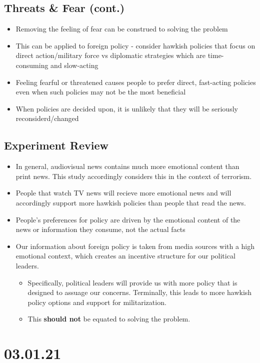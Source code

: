 \documentclass[11pt]{article}
\begin{document}
\subsection*{Threats \& Fear (cont.)}
\label{sec:orgea959f0}
\begin{itemize}
\item Removing the feeling of fear can be construed to solving the problem
\item This can be applied to foreign policy - consider hawkish policies that focus on direct action/military force vs diplomatic strategies which are time-consuming and slow-acting
\item Feeling fearful or threatened causes people to prefer direct, fast-acting policies even when such policies may not be the most beneficial
\item When policies are decided upon, it is unlikely that they will be seriously reconsiderd/changed
\end{itemize}
\subsection*{Experiment Review}
\label{sec:org6c15c8d}
\begin{itemize}
\item In general, audiovisual news contains much more emotional content than print news. This study accordingly considers this in the context of terrorism.
\item People that watch TV news will recieve more emotional news and will accordingly support more hawkish policies than people that read the news.
\item People's preferences for policy are driven by the emotional content of the news or information they consume, not the actual facts
\item Our information about foreign policy is taken from media sources with a high emotional context, which creates an incentive structure for our political leaders.
\begin{itemize}
\item Specifically, political leaders will provide us with more policy that is designed to assuage our concerns. Terminally, this leads to more hawkish policy options and support for militarization.
\item This \textbf{should not} be equated to solving the problem.
\end{itemize}
\end{itemize}
\section*{03.01.21}
\label{sec:orgf677f76}
\end{document}

